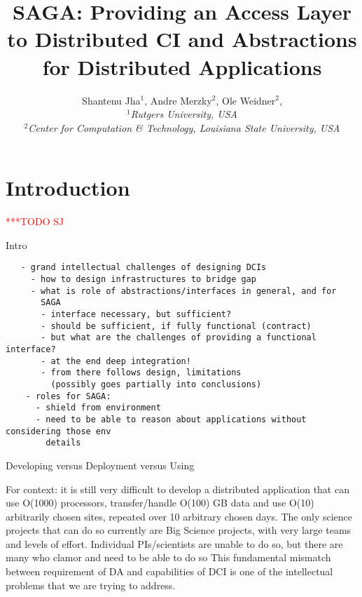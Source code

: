 \documentclass[a4paper,10pt]{article}
\newcommand{\todo}[1]{     {\textcolor{red}  { ***TODO      #1 }}}
\newcommand{\todo}[1]{}
\begin{document}
 \title{ \large \vspace{-3.5em} SAGA: Providing an Access Layer to
   Distributed CI and Abstractions for Distributed Applications}


 \author{\normalsize Shantenu Jha$^{1}$, Andre Merzky$^{2}$, Ole
   Weidner$^{2}$, \\ \small{\emph{$^{1}$Rutgers University,
       USA}}\\ \small{\emph{$^{2}$Center for Computation \&
       Technology, Louisiana State University, USA}}\\ } \date{}
 \maketitle

 
\section{Introduction}
 \todo{SJ}
 \label{intro}

  Intro

 \begin{verbatim}
   - grand intellectual challenges of designing DCIs
     - how to design infrastructures to bridge gap
     - what is role of abstractions/interfaces in general, and for
       SAGA
       - interface necessary, but sufficient?
       - should be sufficient, if fully functional (contract)
       - but what are the challenges of providing a functional interface?
       - at the end deep integration!
       - from there follows design, limitations
         (possibly goes partially into conclusions)
    - roles for SAGA: 
      - shield from environment
      - need to be able to reason about applications without considering those env
        details
 \end{verbatim}

Developing versus Deployment versus Using

For context: it is still very difficult to develop a distributed
application that can use O(1000) processors, transfer/handle O(100) GB
data and use O(10) arbitrarily chosen sites, repeated over 10
arbitrary chosen days. The only science projects that can do so
currently are Big Science projects, with very large teams and levels
of effort.  Individual PIs/scientists are unable to do so, but there
are many who clamor and need to be able to do so This fundamental
mismatch between requirement of DA and capabilities of DCI is one of
the intellectual problems that we are trying to address.
\end{document}
